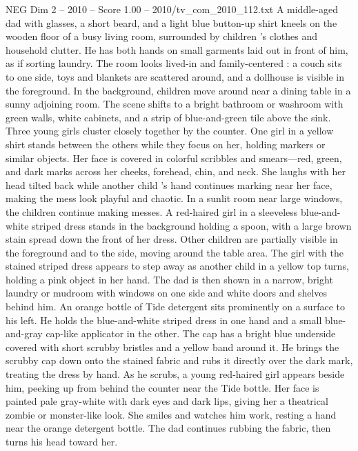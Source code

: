 \begin{textsample}{NEG Dim 2 – 2010 – Score 1.00 – 2010/tv\_com\_2010\_112.txt}  \label{ex:f2_neg_044}
A middle-aged dad with glasses, a short beard, and a light blue button-up shirt kneels on the wooden floor of a busy living room, surrounded by children ’s clothes and household clutter.
He has both hands on small garments laid out in front of him, as if sorting laundry.
The room looks lived-in and family-centered : a couch sits to one side, toys and blankets are scattered around, and a dollhouse is visible in the foreground.
In the background, children move around near a dining table in a sunny adjoining room.
The scene shifts to a bright bathroom or washroom with green walls, white cabinets, and a strip of blue-and-green tile above the sink.
Three young girls cluster closely together by the counter.
One girl in a yellow shirt stands between the others while they focus on her, holding markers or similar objects.
Her face is covered in colorful scribbles and smears—red, green, and dark marks across her cheeks, forehead, chin, and neck.
She laughs with her head tilted back while another child ’s hand continues marking near her face, making the mess look playful and chaotic.
In a sunlit room near large windows, the children continue making messes.
A red-haired girl in a sleeveless blue-and-white striped dress stands in the background holding a spoon, with a large brown stain spread down the front of her dress.
Other children are partially visible in the foreground and to the side, moving around the table area.
The girl with the stained striped dress appears to step away as another child in a yellow top turns, holding a pink object in her hand.
The dad is then shown in a narrow, bright laundry or mudroom with windows on one side and white doors and shelves behind him.
An orange bottle of Tide detergent sits prominently on a surface to his left.
He holds the blue-and-white striped dress in one hand and a small blue-and-gray cap-like applicator in the other.
The cap has a bright blue underside covered with short scrubby bristles and a yellow band around it.
He brings the scrubby cap down onto the stained fabric and rubs it directly over the dark mark, treating the dress by hand.
As he scrubs, a young red-haired girl appears beside him, peeking up from behind the counter near the Tide bottle.
Her face is painted pale gray-white with dark eyes and dark lips, giving her a theatrical zombie or monster-like look.
She smiles and watches him work, resting a hand near the orange detergent bottle.
The dad continues rubbing the fabric, then turns his head toward her.

\end{textsample}
